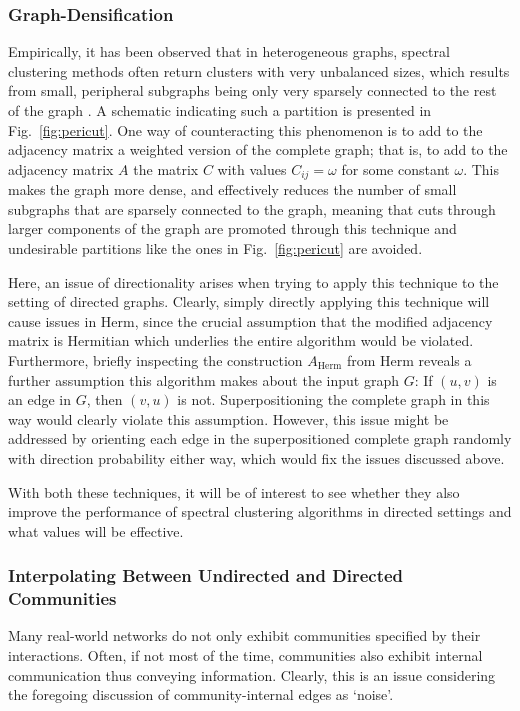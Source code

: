 \subsubsection{Graph-Densification}
Empirically, it has been observed that in heterogeneous graphs, spectral clustering methods often 
return clusters with very unbalanced sizes, which results from small, peripheral subgraphs being only very 
sparsely connected to the rest of the graph \cite{binyureg}.  %
A schematic indicating such a partition is presented in Fig.\ \ref{fig:pericut}.
One way of counteracting this phenomenon is to add to the adjacency matrix a weighted version of 
the complete graph; that is, to add to the adjacency matrix $A$ the matrix $C$ with values $C_{ij} 
= \omega$ for some constant $\omega$. This makes the graph more dense, and effectively reduces the 
number of small subgraphs that are sparsely connected to the graph, meaning that cuts through 
larger components of the graph are promoted through this technique and undesirable partitions like 
the ones in Fig.\ \ref{fig:pericut} are avoided.

Here, an issue of directionality arises when trying to apply this technique to the setting of 
directed graphs. Clearly, simply directly applying this technique will cause issues in
Herm, since the crucial assumption that the modified adjacency matrix is Hermitian which underlies
the entire algorithm would be violated. Furthermore, briefly inspecting the construction 
$A_\mathrm{Herm}$ from Herm reveals a further assumption this algorithm makes about the input 
graph $G$: If $(u,v)$ is an edge in $G$, then $(v,u)$ is not. Superpositioning the complete graph
in this way would clearly violate this assumption. However, this issue might be addressed by 
orienting each edge in the superpositioned complete graph randomly with direction probability 
 either way, which would fix the issues discussed above. 

With both these techniques, it will be of interest to see whether they also improve the 
performance of spectral clustering algorithms in directed settings and what values will be effective.

\subsubsection{Interpolating Between Undirected and Directed Communities}
Many real-world networks do not only exhibit communities specified by their interactions. Often,
if not most of the time, communities also exhibit internal communication thus conveying information.
Clearly, this is an issue considering the foregoing discussion of community-internal edges as 
`noise'. 

